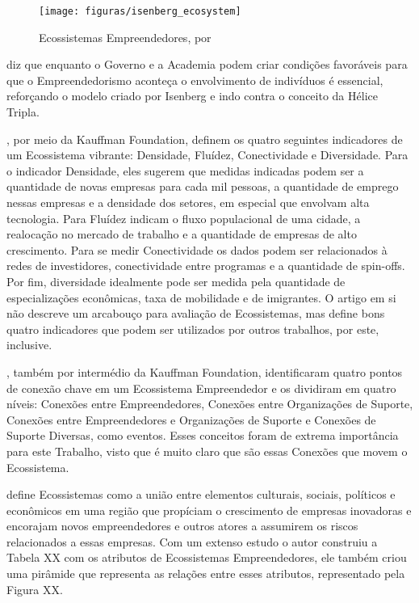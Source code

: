 \begin{figure}[!htb]
\centering
\texttt{[image: figuras/isenberg\_ecosystem]}
\caption{Ecossistemas Empreendedores, por }
\label{figure:isenberg_ecosystem}
\end{figure}

 diz que enquanto o Governo e a Academia podem criar condições favoráveis para que o Empreendedorismo aconteça o envolvimento de indivíduos é essencial, reforçando o modelo criado por Isenberg e indo contra o conceito da Hélice Tripla.

, por meio da Kauffman Foundation, definem os quatro seguintes indicadores de um Ecossistema vibrante: Densidade, Fluídez, Conectividade e Diversidade. Para o indicador Densidade, eles sugerem que medidas indicadas podem ser a quantidade de novas empresas para cada mil pessoas, a quantidade de emprego nessas empresas e a densidade dos setores, em especial que envolvam alta tecnologia. Para Fluídez indicam o fluxo populacional de uma cidade, a realocação no mercado de trabalho e a quantidade de empresas de alto crescimento. Para se medir Conectividade os dados podem ser relacionados à redes de investidores, conectividade entre programas e a quantidade de spin-offs. Por fim, diversidade idealmente pode ser medida pela quantidade de especializações econômicas, taxa de mobilidade e de imigrantes. O artigo em si não descreve um arcabouço para avaliação de Ecossistemas, mas define bons quatro indicadores que podem ser utilizados por outros trabalhos, por este, inclusive. 

, também por intermédio da Kauffman Foundation, identificaram quatro pontos de conexão chave em um Ecossistema Empreendedor e os dividiram em quatro níveis: Conexões entre Empreendedores, Conexões entre Organizações de Suporte, Conexões entre Empreendedores e Organizações de Suporte e Conexões de Suporte Diversas, como eventos. Esses conceitos foram de extrema importância para este Trabalho, visto que é muito claro que são essas Conexões que movem o Ecossistema.

 define Ecossistemas como a união entre elementos culturais, sociais, políticos e econômicos em uma região que propíciam o crescimento de empresas inovadoras e encorajam novos empreendedores e outros atores a assumirem os riscos relacionados a essas empresas. Com um extenso estudo o autor construiu a Tabela XX com os atributos de Ecossistemas Empreendedores, ele também criou uma pirâmide que representa as relações entre esses atributos, representado pela Figura XX.

